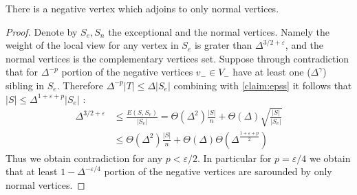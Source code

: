 \begin{claim}
  There is a negative vertex which adjoins to only normal vertices. 
\end{claim}
\begin{proof}
  Denote by $S_{e},S_{n}$ the exceptional and the normal vertices. Namely the weight of the local view for any vertex in $S_{e}$ is grater than $\Delta^{3/2 + \varepsilon}$, and the normal vertices is the complementary vertices set. Suppose through contradiction that for $\Delta^{-p}$ portion of the negative vertices $v_{-}\in V_{-}$ have at least one ($\Delta^{\gamma}$) sibling in $S_{e}$. Therefore $ \Delta^{-p} |T| \le \Delta |S_{e}|$ combining with \cref{claim:epss} it follows that $|S| \le \Delta^{1+\varepsilon + p }|S_{e}|$ : 
  \begin{equation*}
    \begin{split}
      \Delta^{3/2 + \varepsilon} & \le \frac{E(S,S_{e})}{|S_{e}|} = \Theta\left( \Delta^{2} \right)\frac{|S|}{n} + \Theta\left( \Delta \right)\sqrt{ \frac{|S|}{|S_{e}|}  }\\ 
      & \le \Theta(\Delta^{2}) \frac{|S|}{n} + \Theta(\Delta) \Theta\left( \Delta^{\frac{1+\varepsilon + p}{2}} \right)  
    \end{split}
  \end{equation*} 
  Thus we obtain contradiction for any $p < \varepsilon/2$. In particular for $p = \varepsilon/4$ we obtain that at least $1 - \Delta^{-\varepsilon/4}$ portion of the negative vertices are sarounded by only normal vertices. 
 \end{proof}

